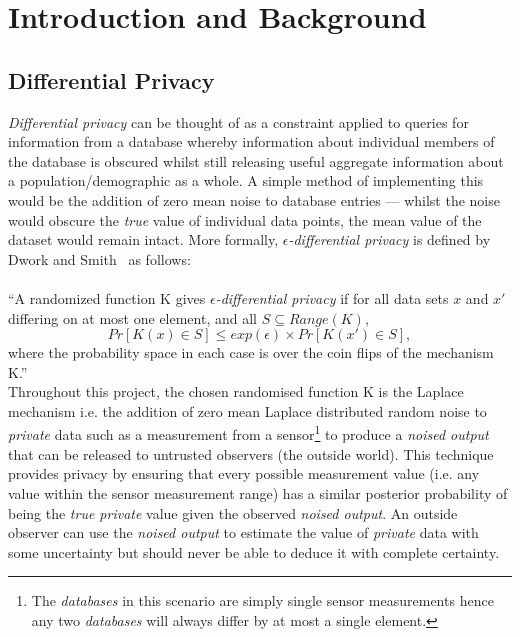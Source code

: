 \documentclass[12pt]{article}
\begin{document}
\newpage


\pagestyle{default}
%
%

\section{Introduction and Background}
  \subsection{Differential Privacy} \label{intro_diff_priv}
    \textit{Differential privacy} can be thought of as a constraint applied to queries for information from a database whereby information about individual members of the database is obscured whilst still releasing useful aggregate information about a population/demographic as a whole. A simple method of implementing this would be the addition of zero mean noise to database entries --- whilst the noise would obscure the \textit{true} value of individual data points, the mean value of the dataset would remain intact. More formally, \textit{$\epsilon$-differential privacy} is defined by Dwork and Smith~\cite{dwork2010differential} as follows:\\
    \\
    ``A randomized function K gives \textit{$\epsilon$-differential privacy} if for all data sets $x$ and $x'$ differing on at most one element, and all $S \subseteq Range(K)$,
    \begin{equation}
      Pr[K(x) \in S] \leq exp(\epsilon) \times Pr[K(x') \in S],
    \end{equation}
    where the probability space in each case is over the coin flips of the mechanism K.''\\

    Throughout this project, the chosen randomised function K is the Laplace mechanism i.e. the addition of zero mean Laplace distributed random noise to \textit{private} data such as a measurement from a sensor\footnote{The \textit{databases} in this scenario are simply single sensor measurements hence any two \textit{databases} will always differ by at most a single element.} to produce a \textit{noised output} that can be released to untrusted observers (the outside world). This technique provides privacy by ensuring that every possible measurement value (i.e. any value within the sensor measurement range) has a similar posterior probability of being the \textit{true private} value given the observed \textit{noised output}. An outside observer can use the \textit{noised output} to estimate the value of \textit{private} data with some uncertainty but should never be able to deduce it with complete certainty.\\
\end{document}
